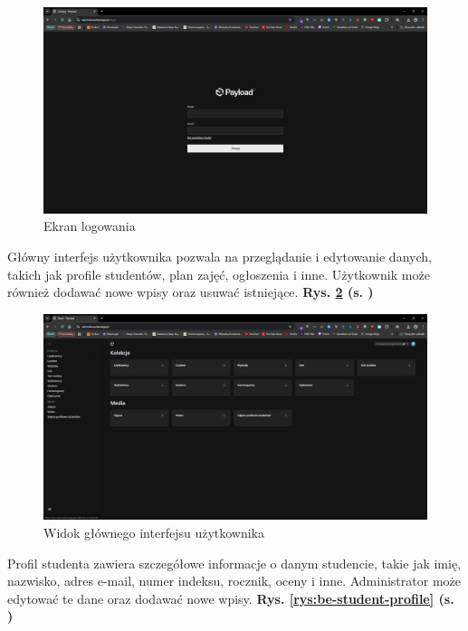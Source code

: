 \begin{figure}[htp!]
	\centering
	\includegraphics[width=\textwidth]{rys/be-login.png}
	\caption{Ekran logowania}
	\label{rys:be-login}
\end{figure}
\newpage
Główny interfejs użytkownika pozwala na przeglądanie i edytowanie danych, takich jak profile studentów, plan zajęć, ogłoszenia i inne. Użytkownik może również dodawać nowe wpisy oraz usuwać istniejące. \textbf{Rys. \ref{rys:be-main} (s. \pageref{rys:be-main})}

\begin{figure}[htp!]
	\centering
	\includegraphics[width=\textwidth]{rys/be-main.png}
	\caption{Widok głównego interfejsu użytkownika}
	\label{rys:be-main}
\end{figure}

Profil studenta zawiera szczegółowe informacje o danym studencie, takie jak imię, nazwisko, adres e-mail, numer indeksu, rocznik, oceny i inne. Administrator może edytować te dane oraz dodawać nowe wpisy. \textbf{Rys. \ref{rys:be-student-profile} (s. \pageref{rys:be-student-profile})}

